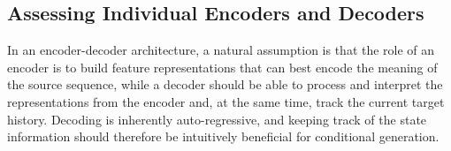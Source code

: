 \documentclass[11pt,a4paper]{article}
\begin{document}






\subsection{Assessing Individual Encoders and Decoders}


In an encoder-decoder architecture, a natural assumption
is that the role of an encoder is to build feature representations that can
best encode the meaning of the source sequence, while a decoder should
be able to process and interpret the representations from the encoder and,
at the same time, track the current target history.
Decoding is inherently auto-regressive,
and keeping track of the state information should therefore
be intuitively beneficial for conditional generation.
\end{document}
